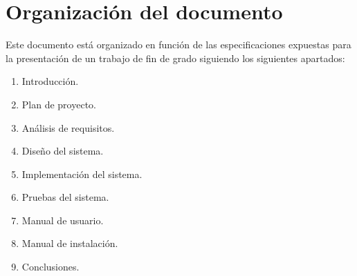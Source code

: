 \section{Organización del documento}
Este documento está organizado en función de las especificaciones expuestas para la presentación de un trabajo de fin de grado siguiendo los siguientes apartados:
\begin{enumerate}
	\item Introducción.
	\item Plan de proyecto.
	\item Análisis de requisitos.
	\item Diseño del sistema.
	\item Implementación del sistema.
	\item Pruebas del sistema.
	\item Manual de usuario.
	\item Manual de instalación.
	\item Conclusiones.
\end{enumerate}
